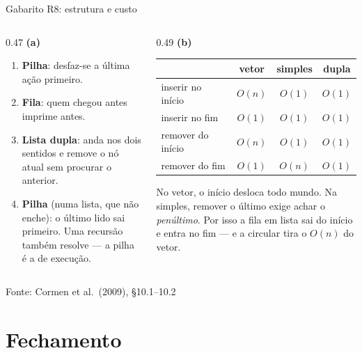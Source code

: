 \documentclass[aspectratio=169]{beamer}
\newcommand{\fonte}[1]{\vfill\hfill{\scriptsize\textcolor{UFSGray}{Fonte: #1}}}
\begin{document}
\begin{frame}{Gabarito R8: estrutura e custo}
  \begin{columns}[T]
    \begin{column}{0.47\textwidth}
      \scriptsize
      \textbf{(a)}
      \begin{enumerate}
        \item \textbf{Pilha}: desfaz-se a última ação primeiro.
        \item \textbf{Fila}: quem chegou antes imprime antes.
        \item \textbf{Lista dupla}: anda nos dois sentidos e remove o nó
          atual sem procurar o anterior.
        \item \textbf{Pilha} (numa lista, que não enche): o último lido sai
          primeiro. Uma recursão também resolve --- a pilha é a de execução.
      \end{enumerate}
    \end{column}
    \begin{column}{0.49\textwidth}
      \textbf{\scriptsize (b)}
      \scriptsize
      \begin{center}
      \begin{tabular}{@{}lccc@{}}
        \toprule
        & vetor & simples & dupla \\
        \midrule
        inserir no início & $O(n)$ & $O(1)$ & $O(1)$ \\
        inserir no fim    & $O(1)$ & $O(1)$ & $O(1)$ \\
        remover do início & $O(n)$ & $O(1)$ & $O(1)$ \\
        remover do fim    & $O(1)$ & \textcolor{UFSRed}{$O(n)$} & $O(1)$ \\
        \bottomrule
      \end{tabular}
      \end{center}
      No vetor, o início desloca todo mundo. Na simples, remover o último
      exige achar o \emph{penúltimo}. Por isso a fila em lista sai do
      início e entra no fim --- e a circular tira o $O(n)$ do vetor.
    \end{column}
  \end{columns}
  \fonte{Cormen et al.\ (2009), §10.1--10.2~\cite{cormen2009introduction}}
\end{frame}

\section*{Fechamento}
\end{document}
